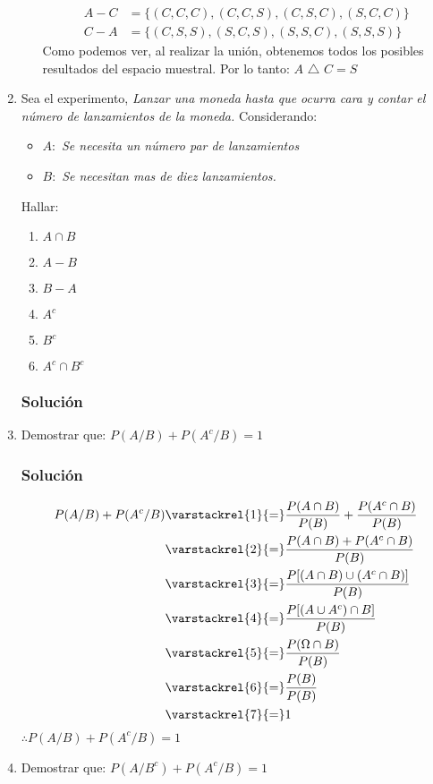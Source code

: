 \begin{enumerate}
\begin{enumerate}
\begin{align*}
A-C &= \{ (C,C,C),(C,C,S),(C,S,C),(S,C,C)\} \\
C-A &= \{ (C,S,S),(S,C,S),(S,S,C),(S,S,S)\} 
\end{align*}
Como podemos ver, al realizar la unión, obtenemos todos los posibles resultados del espacio muestral. Por lo tanto: $A$ {\footnotesize $\triangle$} $C=S$
\end{enumerate}
\item Sea el experimento, \textit{Lanzar una moneda hasta que ocurra cara y contar el número de lanzamientos de la moneda.}  Considerando:
\begin{itemize}
\item $A:$ \textit{Se necesita un número par de lanzamientos}
\item $B:$ \textit{Se necesitan mas de diez lanzamientos.}
\end{itemize}
Hallar:
\begin{enumerate}
\item $A\cap B$
\item $A-B$
\item $B-A$
\item $A^c$
\item $B^c$
\item $A^c \cap B^c$
\end{enumerate}
\subsubsection{Solución}
\item Demostrar que: $P(A/B)+P(A^c/B)=1$
\subsubsection{Solución}
\begin{align*}
P(A/B)+P(A^c/B) &\varstackrel{1}{=} \dfrac{P(A\cap B)}{P(B)} + \dfrac{P(A^c\cap B)}{P(B)} \\
  &\varstackrel{2}{=} \dfrac{P(A\cap B)+P(A^c\cap B)}{P(B)} \\
    &\varstackrel{3}{=} \dfrac{P[(A\cap B)\cup(A^c\cap B)]}{P(B)} \\
      &\varstackrel{4}{=} \dfrac{P[(A\cup A^c)\cap B]}{P(B)} \\
        &\varstackrel{5}{=} \dfrac{P(\Omega\cap B)}{P(B)} \\
           &\varstackrel{6}{=} \dfrac{P(B)}{P(B)} \\
                 &\varstackrel{7}{=} 1 \\
\end{align*}
$\therefore P(A/B)+P(A^c/B)=1$
\item Demostrar que: $P(A/B^c)+P(A^c/B)=1$

\end{enumerate}
